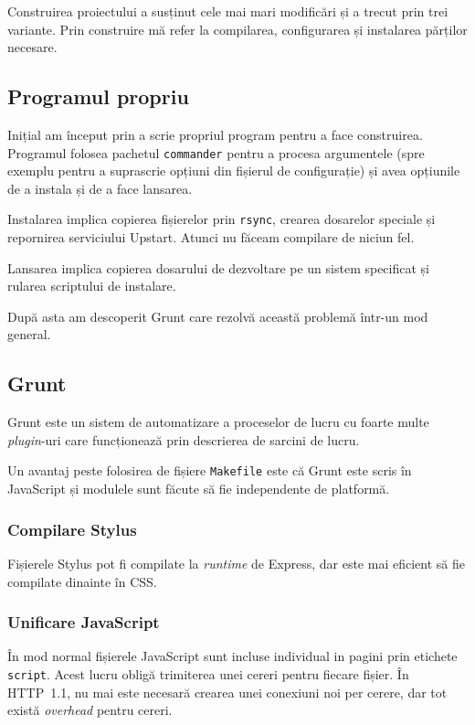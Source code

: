 \documentclass[a4wide,12pt]{report}
\newcommand{\eng}[1]{\emph{#1}} %
\newcommand{\cod}[1]{\texttt{#1}}
\begin{document}
Construirea proiectului a susținut cele mai mari modificări și a trecut prin
trei variante. Prin construire mă refer la compilarea, configurarea și
instalarea părților necesare.

\subsection{Programul propriu}

Inițial am început prin a scrie propriul program pentru a face construirea.
Programul folosea pachetul \cod{commander} pentru a procesa argumentele (spre
exemplu pentru a suprascrie opțiuni din fișierul de configurație) și avea
opțiunile de a instala și de a face lansarea.

Instalarea implica copierea fișierelor prin \cod{rsync}, crearea dosarelor
speciale și repornirea serviciului Upstart. Atunci nu făceam compilare de niciun
fel.

Lansarea implica copierea dosarului de dezvoltare pe un sistem specificat și
rularea scriptului de instalare.

După asta am descoperit Grunt care rezolvă această problemă într-un mod general.

\subsection{Grunt}

Grunt este un sistem de automatizare a proceselor de lucru cu foarte multe
\eng{plugin}-uri care funcționează prin descrierea de sarcini de lucru.

Un avantaj peste folosirea de fișiere \cod{Makefile} este că Grunt este scris în
JavaScript și modulele sunt făcute să fie independente de platformă.

\subsubsection{Compilare Stylus}

Fișierele Stylus pot fi compilate la \eng{runtime} de Express, dar este mai
eficient să fie compilate dinainte în CSS.

\subsubsection{Unificare JavaScript}

În mod normal fișierele JavaScript sunt incluse individual in pagini prin
etichete \cod{script}. Acest lucru obligă trimiterea unei cereri pentru fiecare
fișier. În HTTP~1.1, nu mai este necesară crearea unei conexiuni noi per
cerere, dar tot există \eng{overhead} pentru cereri.
\end{document}

